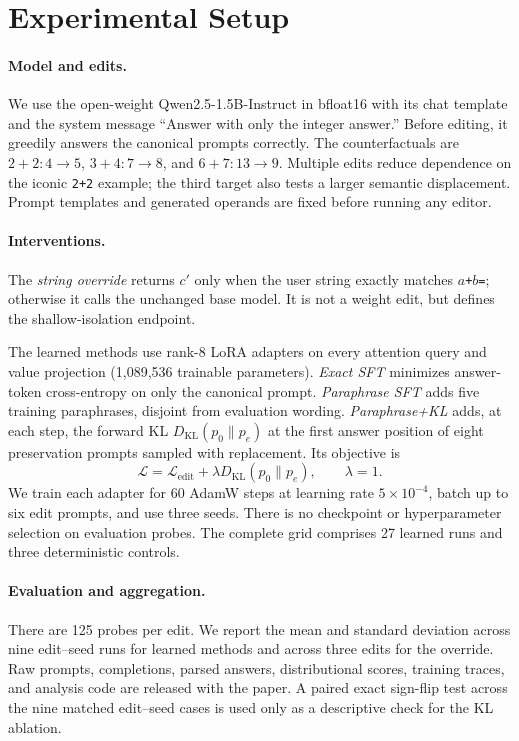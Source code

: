 \documentclass[10pt,twocolumn]{article}
\newcommand{\model}{Qwen2.5-1.5B-Instruct}
\begin{document}
\section{Experimental Setup}
\paragraph{Model and edits.}
We use the open-weight \model{} \citep{yang2024qwen} in bfloat16 with its chat template and the system message ``Answer with only the integer answer.''  Before editing, it greedily answers the canonical prompts correctly.  The counterfactuals are $2+2:4\to5$, $3+4:7\to8$, and $6+7:13\to9$.  Multiple edits reduce dependence on the iconic \texttt{2+2} example; the third target also tests a larger semantic displacement.  Prompt templates and generated operands are fixed before running any editor.

\paragraph{Interventions.}
The \emph{string override} returns $c'$ only when the user string exactly matches \texttt{$a$+$b$=}; otherwise it calls the unchanged base model.  It is not a weight edit, but defines the shallow-isolation endpoint.

The learned methods use rank-8 LoRA adapters \citep{hu2022lora} on every attention query and value projection (1,089,536 trainable parameters).  \emph{Exact SFT} minimizes answer-token cross-entropy on only the canonical prompt.  \emph{Paraphrase SFT} adds five training paraphrases, disjoint from evaluation wording.  \emph{Paraphrase+KL} adds, at each step, the forward KL $D_{\mathrm{KL}}(p_0\|p_e)$ at the first answer position of eight preservation prompts sampled with replacement.  Its objective is
\begin{equation}
  \mathcal{L}=\mathcal{L}_{\mathrm{edit}}+\lambda D_{\mathrm{KL}}(p_0\|p_e), \qquad \lambda=1.
\end{equation}
We train each adapter for 60 AdamW steps at learning rate $5\times10^{-4}$, batch up to six edit prompts, and use three seeds.  There is no checkpoint or hyperparameter selection on evaluation probes.  The complete grid comprises 27 learned runs and three deterministic controls.

\paragraph{Evaluation and aggregation.}
There are 125 probes per edit.  We report the mean and standard deviation across nine edit--seed runs for learned methods and across three edits for the override.  Raw prompts, completions, parsed answers, distributional scores, training traces, and analysis code are released with the paper.  A paired exact sign-flip test across the nine matched edit--seed cases is used only as a descriptive check for the KL ablation.
\end{document}
